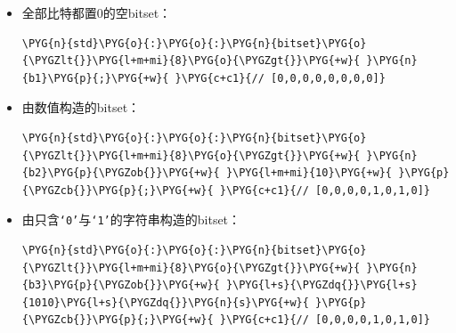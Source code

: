 \begin{itemize}
\item 全部比特都置0的空bitset：



\begin{codeblockbg}
\begin{Verbatim}[commandchars=\\\{\},breaklines=true,breakanywhere=true,fontsize=\codefont,xleftmargin=17bp]
\PYG{n}{std}\PYG{o}{:}\PYG{o}{:}\PYG{n}{bitset}\PYG{o}{\PYGZlt{}}\PYG{l+m+mi}{8}\PYG{o}{\PYGZgt{}}\PYG{+w}{ }\PYG{n}{b1}\PYG{p}{;}\PYG{+w}{ }\PYG{c+c1}{// [0,0,0,0,0,0,0,0]}
\end{Verbatim}
\end{codeblockbg}



\item 由数值构造的bitset：



\begin{codeblockbg}
\begin{Verbatim}[commandchars=\\\{\},breaklines=true,breakanywhere=true,fontsize=\codefont,xleftmargin=17bp]
\PYG{n}{std}\PYG{o}{:}\PYG{o}{:}\PYG{n}{bitset}\PYG{o}{\PYGZlt{}}\PYG{l+m+mi}{8}\PYG{o}{\PYGZgt{}}\PYG{+w}{ }\PYG{n}{b2}\PYG{p}{\PYGZob{}}\PYG{+w}{ }\PYG{l+m+mi}{10}\PYG{+w}{ }\PYG{p}{\PYGZcb{}}\PYG{p}{;}\PYG{+w}{ }\PYG{c+c1}{// [0,0,0,0,1,0,1,0]}
\end{Verbatim}
\end{codeblockbg}



\item 由只含\texttt{‘0’}与\texttt{‘1’}的字符串构造的bitset：



\begin{codeblockbg}
\begin{Verbatim}[commandchars=\\\{\},breaklines=true,breakanywhere=true,fontsize=\codefont,xleftmargin=17bp]
\PYG{n}{std}\PYG{o}{:}\PYG{o}{:}\PYG{n}{bitset}\PYG{o}{\PYGZlt{}}\PYG{l+m+mi}{8}\PYG{o}{\PYGZgt{}}\PYG{+w}{ }\PYG{n}{b3}\PYG{p}{\PYGZob{}}\PYG{+w}{ }\PYG{l+s}{\PYGZdq{}}\PYG{l+s}{1010}\PYG{l+s}{\PYGZdq{}}\PYG{n}{s}\PYG{+w}{ }\PYG{p}{\PYGZcb{}}\PYG{p}{;}\PYG{+w}{ }\PYG{c+c1}{// [0,0,0,0,1,0,1,0]}
\end{Verbatim}
\end{codeblockbg}



\end{itemize}
